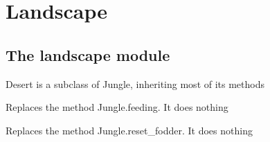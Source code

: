 \documentclass[a4paper,10pt,english]{sphinxmanual}
\begin{document}
\chapter{Landscape}
\label{\detokenize{landscape:landscape}}\label{\detokenize{landscape::doc}}

\section{The landscape module}
\label{\detokenize{landscape:the-landscape-module}}\label{\detokenize{landscape:module-biosim.landscape}}

\begin{fulllineitems}
\label{\detokenize{landscape:biosim.landscape.Desert}}
Desert is a subclass of Jungle, inheriting most of its methods

\begin{fulllineitems}
\label{\detokenize{landscape:biosim.landscape.Desert.feeding}}
Replaces the method Jungle.feeding. It does nothing

\end{fulllineitems}


\begin{fulllineitems}
\label{\detokenize{landscape:biosim.landscape.Desert.reset_fodder}}
Replaces the method Jungle.reset\_fodder. It does nothing

\end{fulllineitems}


\end{fulllineitems}

\end{document}
